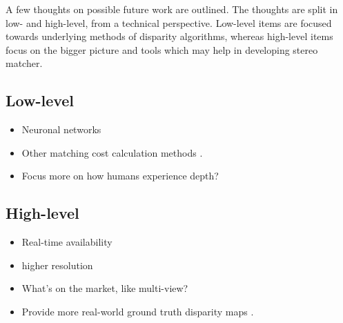 A few thoughts on possible future work are outlined.
The thoughts are split in low- and high-level, from a technical perspective.
Low-level items are focused towards underlying methods of disparity algorithms, whereas high-level items focus on the bigger picture and tools which may help in developing stereo matcher.

\subsection*{Low-level}

\begin{itemize}
  \item Neuronal networks \citep{olshausen1996emergence}
  \item Other matching cost calculation methods \citep{hermann2010gradient}.
  \item Focus more on how humans experience depth? \citep{deangelis1995neuronal}
\end{itemize}

\subsection*{High-level}

\begin{itemize}
  \item Real-time availability
  \item higher resolution
  \item What's on the market, like multi-view?
  \item Provide more real-world ground truth disparity maps \citep{kondermann2015stereo, Geiger2011IV}.
\end{itemize}
